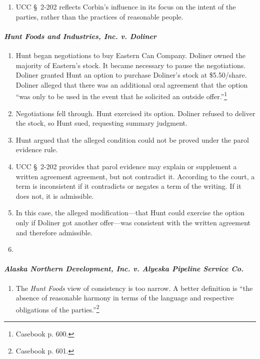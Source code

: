\begin{enumerate}
    \item UCC \S\ 2-202 reflects Corbin's influence in its focus on the intent 
    of the parties, rather than the practices of reasonable people.
\end{enumerate}

\paragraph{\emph{Hunt Foods and Industries, Inc. v. Doliner}}

\begin{enumerate}
    \item Hunt began negotiations to buy Eastern Can Company. Doliner owned 
    the majority of Eastern's stock. It became necessary to pause the 
    negotiations. Doliner granted Hunt an option to purchase Doliner's stock 
    at \$5.50/share. Doliner alleged that there was an additional oral 
    agreement that the option ``was only to be used in the event that he 
    solicited an outside offer.''\footnote{Casebook p. 600.}
    \item Negotiations fell through. Hunt exercised its option. Doliner 
    refused to deliver the stock, so Hunt sued, requesting summary judgment.
    \item Hunt argued that the alleged condition could not be proved under the 
    parol evidence rule.
    \item UCC \S\ 2-202 provides that parol evidence may explain or supplement 
    a written agreement agreement, but not contradict it. According to the 
    court, a term is inconsistent if it contradicts or negates a term of the 
    writing. If it does not, it is admissible.
    \item In this case, the alleged modification---that Hunt could exercise 
    the option only if Doliner got another offer---was consistent with the 
    written agreement and therefore admissible.
    \item
\end{enumerate}

\paragraph{\emph{Alaska Northern Development, Inc. v. Alyeska Pipeline Service 
Co.}}

\begin{enumerate}
    \item The \emph{Hunt Foods} view of consistency is too narrow. A better 
    definition is ``the absence of reasonable harmony in terms of the language 
    and respective obligations of the parties.''\footnote{Casebook p. 601.}
\end{enumerate}

